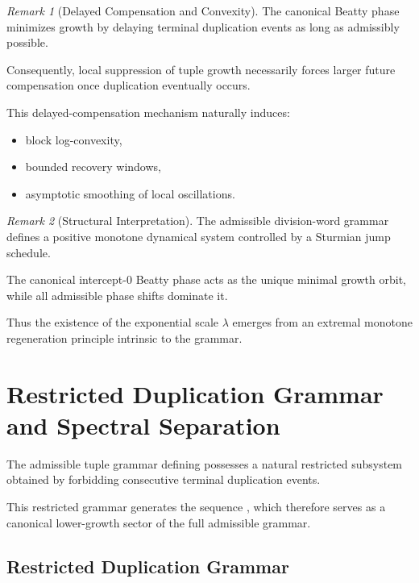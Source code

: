 \documentclass[12pt, oneside]{article}
\numberwithin{equation}{section}
\theoremstyle{definition}
\theoremstyle{plain}
\theoremstyle{remark}
\newtheorem*{remark}{Remark}
\begin{document}
\begin{remark}[Delayed Compensation and Convexity]
The canonical Beatty phase minimizes growth by delaying terminal
duplication events as long as admissibly possible.

Consequently, local suppression of tuple growth necessarily forces
larger future compensation once duplication eventually occurs.

This delayed-compensation mechanism naturally induces:
\begin{itemize}
\item block log-convexity,
\item bounded recovery windows,
\item asymptotic smoothing of local oscillations.
\end{itemize}
\end{remark}


\begin{remark}[Structural Interpretation]
The admissible division-word grammar defines a positive monotone
dynamical system controlled by a Sturmian jump schedule.

The canonical intercept-$0$ Beatty phase acts as the unique minimal
growth orbit, while all admissible phase shifts dominate it.

Thus the existence of the exponential scale $\lambda$ emerges from
an extremal monotone regeneration principle intrinsic to the grammar.
\end{remark}

\section{Restricted Duplication Grammar and Spectral Separation}
\label{sec:restricted-grammar}

The admissible tuple grammar defining  possesses a natural
restricted subsystem obtained by forbidding consecutive terminal
duplication events.

This restricted grammar generates the sequence , which
therefore serves as a canonical lower-growth sector of the full
admissible grammar.


\subsection{Restricted Duplication Grammar}
\end{document}
